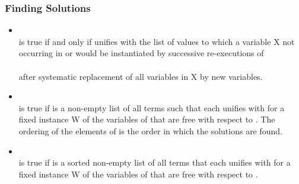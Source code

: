 \subsubsection{Finding Solutions}
\begin{itemize}
%
\item {}\\
\noindent{} is true if and only if
 unifies with the list of values to which a variable X not
occurring in  or  would be instantiated
by successive re-executions of\\
\\
\noindent after systematic replacement of all variables in X by
new variables.\\
%
\item {}\\
\noindent{} is true if
 is a non-empty list of all terms such that each
unifies with  for a fixed instance W of the variables
of  that are free with respect to . The
ordering of the elements of  is the order in which
the solutions are found.\\
%
\item {}\\
\noindent{} is true if  is a
sorted non-empty list of all terms that each unifies with
 for a fixed instance W of the variables of 
that are free with respect to .\\
%
\end{itemize}

